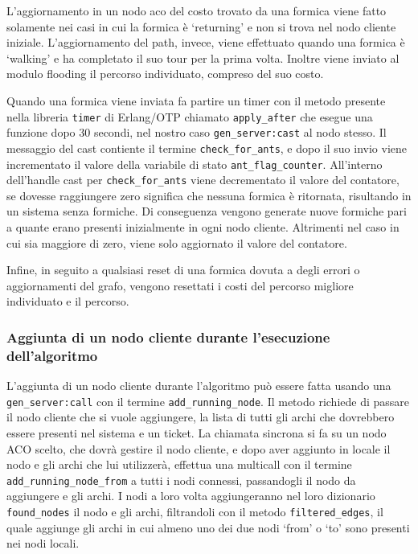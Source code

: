 L'aggiornamento in un nodo aco del costo trovato da una formica viene fatto solamente nei casi in cui la formica è `returning' e non si trova nel nodo cliente iniziale. L'aggiornamento del path, invece, viene effettuato quando una formica è `walking' e ha completato il suo tour per la prima volta. 
Inoltre viene inviato al modulo flooding il percorso individuato, compreso del suo costo.

Quando una formica viene inviata fa partire un timer con il metodo presente nella libreria \texttt{timer} di Erlang/OTP chiamato \texttt{apply\_after} che esegue una funzione dopo 30 secondi, nel nostro caso \texttt{gen\_server:cast} al nodo stesso. 
Il messaggio del cast contiente il termine \texttt{check\_for\_ants}, e dopo il suo invio viene incrementato il valore della variabile di stato \texttt{ant\_flag\_counter}.
All'interno dell'handle cast per \texttt{check\_for\_ants} viene decrementato il valore del contatore, se dovesse raggiungere zero significa che nessuna formica è ritornata, risultando in un sistema senza formiche. Di conseguenza vengono generate nuove formiche pari a quante erano presenti inizialmente in ogni nodo cliente. 
Altrimenti nel caso in cui sia maggiore di zero, viene solo aggiornato il valore del contatore.

Infine, in seguito a qualsiasi reset di una formica dovuta a degli errori o aggiornamenti del grafo, vengono resettati i costi del percorso migliore individuato e il percorso.

\subsubsection{Aggiunta di un nodo cliente durante l'esecuzione dell'algoritmo}
L'aggiunta di un nodo cliente durante l'algoritmo può essere fatta usando una \texttt{gen\_server:call} con il termine \texttt{add\_running\_node}. Il metodo richiede di passare il nodo cliente che si vuole aggiungere, la lista di tutti gli archi che dovrebbero essere presenti nel sistema e un ticket.
La chiamata sincrona si fa su un nodo ACO scelto, che dovrà gestire il nodo cliente, e dopo aver aggiunto in locale il nodo e gli archi che lui utilizzerà, effettua una multicall con il termine \texttt{add\_running\_node\_from} a tutti i nodi connessi, passandogli il nodo da aggiungere e gli archi.
I nodi a loro volta aggiungeranno nel loro dizionario \texttt{found\_nodes} il nodo e gli archi, filtrandoli con il metodo \texttt{filtered\_edges}, il quale aggiunge gli archi in cui almeno uno dei due nodi `from' o `to' sono presenti nei nodi locali.

